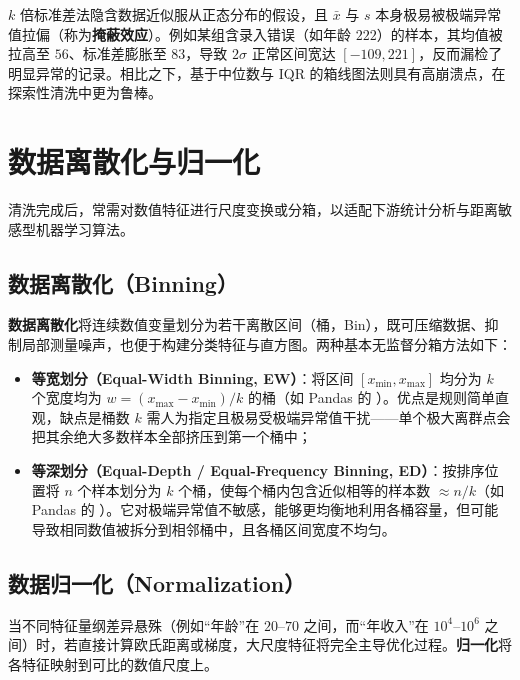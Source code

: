 \begin{pitfall}[均值与标准差对极端异常值高度敏感]\label{pit:mean-std-outlier}
$k$ 倍标准差法隐含数据近似服从正态分布的假设，且 $\bar{x}$ 与 $s$ 本身极易被极端异常值拉偏（称为\textbf{掩蔽效应}）。例如某组含录入错误（如年龄 $222$）的样本，其均值被拉高至 $56$、标准差膨胀至 $83$，导致 $2\sigma$ 正常区间宽达 $[-109, 221]$，反而漏检了明显异常的记录。相比之下，基于中位数与 $\mathrm{IQR}$ 的箱线图法则具有高崩溃点，在探索性清洗中更为鲁棒。
\end{pitfall}

\section{数据离散化与归一化}\label{sec:discretization-normalization}

清洗完成后，常需对数值特征进行尺度变换或分箱，以适配下游统计分析与距离敏感型机器学习算法。

\subsection{数据离散化（Binning）}

\textbf{数据离散化}将连续数值变量划分为若干离散区间（桶，Bin），既可压缩数据、抑制局部测量噪声，也便于构建分类特征与直方图。两种基本无监督分箱方法如下：
\begin{itemize}
  \item \textbf{等宽划分（Equal-Width Binning, EW）}：将区间 $[x_{\min}, x_{\max}]$ 均分为 $k$ 个宽度均为 $w = (x_{\max} - x_{\min}) / k$ 的桶（如 Pandas 的 ）。优点是规则简单直观，缺点是桶数 $k$ 需人为指定且极易受极端异常值干扰——单个极大离群点会把其余绝大多数样本全部挤压到第一个桶中；
  \item \textbf{等深划分（Equal-Depth / Equal-Frequency Binning, ED）}：按排序位置将 $n$ 个样本划分为 $k$ 个桶，使每个桶内包含近似相等的样本数 $\approx n/k$（如 Pandas 的 ）。它对极端异常值不敏感，能够更均衡地利用各桶容量，但可能导致相同数值被拆分到相邻桶中，且各桶区间宽度不均匀。
\end{itemize}

\subsection{数据归一化（Normalization）}

当不同特征量纲差异悬殊（例如“年龄”在 $20$–$70$ 之间，而“年收入”在 $10^4$–$10^6$ 之间）时，若直接计算欧氏距离或梯度，大尺度特征将完全主导优化过程。\textbf{归一化}将各特征映射到可比的数值尺度上。

